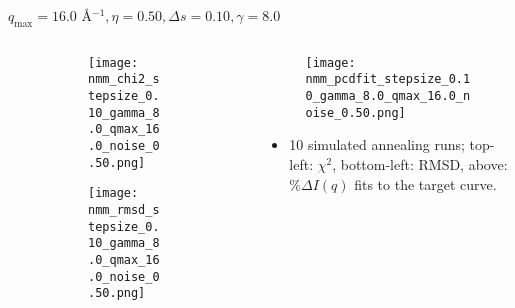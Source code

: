 \documentclass{beamer}
\begin{document}
\begin{frame}{$ q_{\textrm{max}}=16.0 $ \AA $^{-1}, \eta=0.50, \Delta s=0.10, \gamma=8.0$}
	\begin{columns}
		\begin{column}{.5\textwidth}
			\begin{figure}[H]
			\centering
			\begin{subfigure}[b]{\textwidth}
				\centering
				\texttt{[image: nmm\_chi2\_stepsize\_0.10\_gamma\_8.0\_qmax\_16.0\_noise\_0.50.png]}
				\label{fig:}
			\end{subfigure}
			\begin{subfigure}[b]{\textwidth}
				\centering
				\texttt{[image: nmm\_rmsd\_stepsize\_0.10\_gamma\_8.0\_qmax\_16.0\_noise\_0.50.png]}
				\label{fig:}
			\end{subfigure}
			\end{figure}
		\end{column}
		\begin{column}{.5\textwidth}
			\begin{figure}[H]
				\centering
				\texttt{[image: nmm\_pcdfit\_stepsize\_0.10\_gamma\_8.0\_qmax\_16.0\_noise\_0.50.png]}
				\label{fig:}
			\end{figure}
			\begin{itemize}
				\item 10 simulated annealing runs; top-left: $\chi^2$, bottom-left: RMSD, above: $\%\Delta I(q)$ fits to the target curve.
			\end{itemize}
		\end{column}
	\end{columns}
\end{frame}
 
\end{document}
